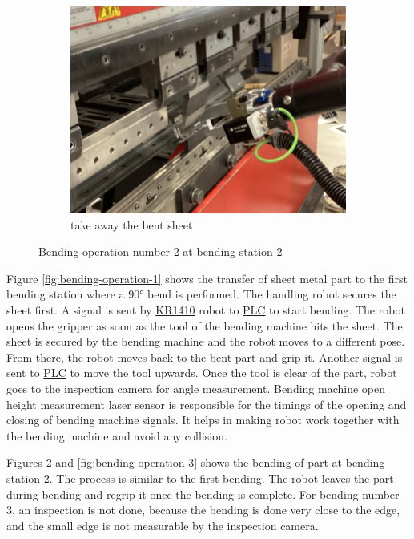 \begin{figure}[h]
    \begin{subfigure}[b]{0.32\textwidth}
        \centering
        \includegraphics[width=\textwidth]{figures/bending/bending2-002.png}
        \caption{take away the bent sheet}
        \label{subfig:bending2-after}
    \end{subfigure}\hspace{0.1cm}
    \caption{Bending operation number 2 at bending station 2}
    \label{fig:bending-operation-2}
\end{figure}


Figure \ref{fig:bending-operation-1} shows the transfer of sheet metal part to the first bending station where a 90° bend is performed. The handling robot secures the sheet first. A signal is sent by \hyperref[acro:KR]{KR1410} robot to \hyperref[acro:PLC]{PLC} to start bending. The robot opens the gripper as soon as the tool of the bending machine hits the sheet. The sheet is secured by the bending machine and the robot moves to a different pose. From there, the robot moves back to the bent part and grip it. Another signal is sent to \hyperref[acro:PLC]{PLC} to move the tool upwards. Once the tool is clear of the part, robot goes to the inspection camera for angle measurement. Bending machine open height measurement laser sensor is responsible for the timings of the opening and closing of bending machine signals. It helps in making robot work together with the bending machine and avoid any collision.


Figures \ref{fig:bending-operation-2} and \ref{fig:bending-operation-3} shows the bending of part at bending station 2. The process is similar to the first bending. The robot leaves the part during bending and regrip it once the bending is complete. For bending number 3, an inspection is not done, because the bending is done very close to the edge, and the small edge is not measurable by the inspection camera.


